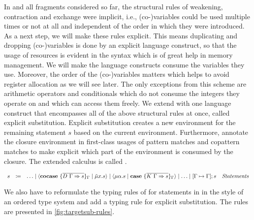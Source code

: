 In \targetlang{} and all fragments considered so far, the structural rules of weakening, contraction and exchange were implicit, i.e., (co-)variables could be used multiple times or not at all and independent of the order in which they were introduced.
As a next step, we will make these rules explicit.
This means duplicating and dropping (co-)variables is done by an explicit language construct, so that the usage of resources is evident in the syntax which is of great help in memory management.
We will make the language constructs consume the variables they use.
Moreover, the order of the (co-)variables matters which helps to avoid register allocation as we will see later.
The only exceptions from this scheme are arithmetic operators and conditionals which do not consume the integers they operate on and which can access them freely.
We extend \targetsub{} with one language construct that encompasses all of the above structural rules at once, called explicit substitution.
Explicit substitution creates a new environment for the remaining statement $s$ based on the current environment.
Furthermore, annotate the closure environment in first-class usages of pattern matches and copattern matches to make explicit which part of the environment is consumed by the closure.
The extended calculus is called \targetsub.

\begin{definition}
  \[
    \begin{array}{rcll}
      s & \coloneqq & \ldots \mid \cut{\cocase{\overline{D\ \Gamma \Rightarrow s}}_{\Gamma}}{\tilde{\mu}x.s} \mid \cut{\mu\alpha.s}{\case{\overline{K\ \Gamma \Rightarrow s}}_{\Gamma}} \mid \ldots \mid \substitute{\Gamma \mapsto \Gamma}{s} & \emph{Statements}\\
    \end{array}
  \]
\end{definition}

We also have to reformulate the typing rules of \targetred{} for statements in \targetsub{} in the style of an ordered type system and add a typing rule for explicit substitution.
The rules are presented in \cref{fig:targetsub-rules}.


